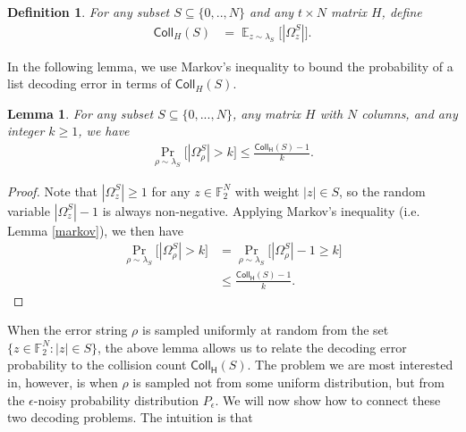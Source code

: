 \documentclass[12pt]{article}
\newtheorem{definition}{Definition}
\newtheorem{lemma}[theorem]{Lemma}
\newcommand{\F}{\mathbb{F}}
\newcommand{\E}{\mathop \mathbb{E}}
\begin{document}
\begin{definition}
For any subset $S\subseteq \{0,..,N\}$ and any $t\times N$ matrix $H$, define
\begin{align*}
\mathsf{Coll}_H(S)&=\E_{z\sim \lambda_S}\big[|\Omega_z^S|\big].
\end{align*}
\end{definition}
In the following lemma, we use Markov's inequality to bound the probability of a list decoding error in terms of $\mathsf{Coll}_H(S)$.
\begin{lemma}\label{collisionuniform}
For any subset $S\subseteq \{0,...,N\}$, any matrix $H$ with $N$ columns, and any integer $k\geq 1$, we have
\begin{align*}
  \Pr_{\rho\sim \lambda_{S}}\big[|\Omega_\rho^S|>k\big]\leq\frac{ \mathsf{Coll_H}(S) -1}{k}.
\end{align*}
\end{lemma}
\begin{proof}
Note that $|\Omega_z^S|\geq 1$ for any $z\in\F_2^N$ with weight $|z|\in S$, so the random variable $|\Omega_z^S|- 1$ is always non-negative. Applying Markov's inequality (i.e. Lemma \ref{markov}), we then have
\begin{align*}
  \Pr_{\rho\sim \lambda_{S}}\big[|\Omega_\rho^S|>k\big]&=\Pr_{\rho\sim \lambda_{S}}\big[|\Omega_\rho^S|-1\geq k\big]\\
  &\leq\frac{ \mathsf{Coll_H}(S) -1}{k}.
\end{align*}
\end{proof}
When the error string $\rho$ is sampled uniformly at random from the set $\{z\in\mathbb{F}_2^N:|z|\in S\}$, the above lemma allows us to relate the decoding error probability to the collision count $\mathsf{Coll_H}(S)$. The problem we are most interested in, however, is when $\rho$ is sampled not from some uniform distribution, but from the $\epsilon$-noisy probability distribution $P_\epsilon$. We will now show how to connect these two decoding problems. The intuition is that
\end{document}
